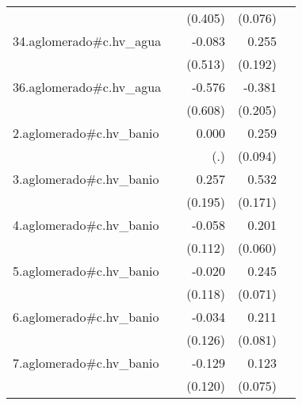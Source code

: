 {\begin{longtable}{l*{4}{D{.}{.}{-1}}}
            &                     &     (0.405)         &     (0.076)         &                     \\
\addlinespace
34.aglomerado#c.hv\_agua&                     &      -0.083         &       0.255         &                     \\
            &                     &     (0.513)         &     (0.192)         &                     \\
\addlinespace
36.aglomerado#c.hv\_agua&                     &      -0.576         &      -0.381         &                     \\
            &                     &     (0.608)         &     (0.205)         &                     \\
\addlinespace
2.aglomerado#c.hv\_banio&                     &       0.000         &       0.259\sym{**} &                     \\
            &                     &         (.)         &     (0.094)         &                     \\
\addlinespace
3.aglomerado#c.hv\_banio&                     &       0.257         &       0.532\sym{**} &                     \\
            &                     &     (0.195)         &     (0.171)         &                     \\
\addlinespace
4.aglomerado#c.hv\_banio&                     &      -0.058         &       0.201\sym{***}&                     \\
            &                     &     (0.112)         &     (0.060)         &                     \\
\addlinespace
5.aglomerado#c.hv\_banio&                     &      -0.020         &       0.245\sym{***}&                     \\
            &                     &     (0.118)         &     (0.071)         &                     \\
\addlinespace
6.aglomerado#c.hv\_banio&                     &      -0.034         &       0.211\sym{**} &                     \\
            &                     &     (0.126)         &     (0.081)         &                     \\
\addlinespace
7.aglomerado#c.hv\_banio&                     &      -0.129         &       0.123         &                     \\
            &                     &     (0.120)         &     (0.075)         &                     \\

\end{longtable}}
